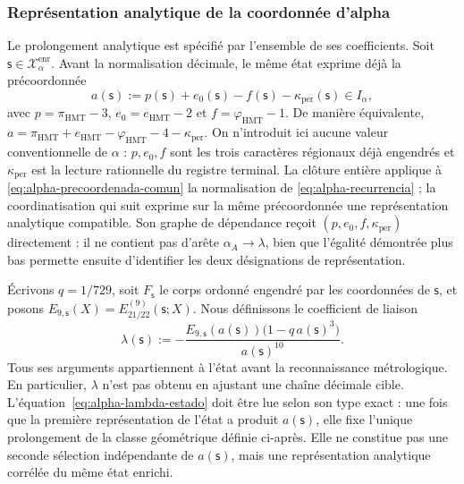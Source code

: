 \subsubsection{Représentation analytique de la coordonnée d'alpha}
\label{subsec:alpha-lector-completo-rev08}

Le prolongement analytique est spécifié par l'ensemble de ses coefficients.
Soit \(\mathsf s\in\mathcal X_\alpha^{\mathrm{enr}}\). Avant
la normalisation décimale, le même état exprime déjà la précoordonnée
\begin{equation}
 a(\mathsf s):=p(\mathsf s)+e_0(\mathsf s)-f(\mathsf s)
                 -\kappa_{\mathrm{per}}(\mathsf s)\in I_\alpha,
 \label{eq:alpha-precoordenada-comun}
\end{equation}
avec \(p=\pi_{\mathrm{HMT}}-3\),
\(e_0=e_{\mathrm{HMT}}-2\) et
\(f=\varphi_{\mathrm{HMT}}-1\). De manière équivalente,
\(a=\pi_{\mathrm{HMT}}+e_{\mathrm{HMT}}-
\varphi_{\mathrm{HMT}}-4-\kappa_{\mathrm{per}}\). On n'introduit ici aucune valeur
conventionnelle de \(\alpha\) : \(p,e_0,f\) sont les trois caractères régionaux déjà
engendrés et \(\kappa_{\mathrm{per}}\) est la lecture rationnelle du registre
terminal. La clôture entière applique à
\eqref{eq:alpha-precoordenada-comun} la normalisation de
\eqref{eq:alpha-recurrencia} ; la coordinatisation qui suit exprime sur la même
précoordonnée une représentation analytique compatible. Son graphe de
dépendance reçoit \((p,e_0,f,\kappa_{\mathrm{per}})\) directement : il ne
contient pas d'arête \(\alpha_A\to\lambda\), bien que l'égalité démontrée plus
bas permette ensuite d'identifier les deux désignations de représentation.

Écrivons \(q=1/729\), soit \(F_{\mathsf s}\) le corps ordonné engendré par
les coordonnées de \(\mathsf s\), et posons
\(E_{9,\mathsf s}(X)=E_{21/22}^{(9)}(\mathsf s;X)\). Nous définissons le coefficient
de liaison
\begin{equation}
 \lambda(\mathsf s):=
 -\frac{E_{9,\mathsf s}(a(\mathsf s))
         \bigl(1-q\,a(\mathsf s)^3\bigr)}{a(\mathsf s)^{10}}.
 \label{eq:alpha-lambda-estado}
\end{equation}
Tous ses arguments appartiennent à l'état avant la reconnaissance
métrologique. En particulier, \(\lambda\) n'est pas obtenu en ajustant une chaîne
décimale cible. L'équation~\eqref{eq:alpha-lambda-estado} doit être lue selon
son type exact : une fois que la première représentation de l'état a produit
\(a(\mathsf s)\), elle fixe l'unique prolongement de la classe géométrique
définie ci-après. Elle ne constitue pas une seconde sélection indépendante de
\(a(\mathsf s)\), mais une représentation analytique corrélée du même
état enrichi.

